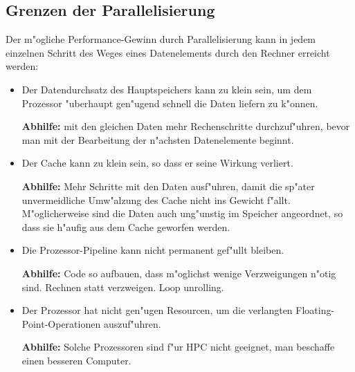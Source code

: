 \subsection{Grenzen der Parallelisierung}
Der m"ogliche Performance-Gewinn durch Parallelisierung kann in jedem einzelnen
Schritt des Weges eines Datenelements durch den Rechner erreicht werden:
\begin{itemize}
\item Der Datendurchsatz des Hauptspeichers kann zu klein sein, um dem 
Prozessor "uberhaupt gen"ugend schnell die Daten liefern zu k"onnen.

{\bf Abhilfe:} mit den gleichen Daten mehr
Rechenschritte durchzuf"uhren, bevor man mit der
Bearbeitung der n"achsten Datenelemente beginnt.
\item Der Cache kann zu klein sein, so dass er seine Wirkung verliert.

{\bf Abhilfe:}
Mehr Schritte mit den Daten ausf"uhren, damit die sp"ater unvermeidliche
Umw"alzung des Cache nicht ins Gewicht f"allt.
M"oglicherweise sind die Daten auch ung"unstig im Speicher angeordnet,
so dass sie h"aufig aus dem Cache geworfen werden.

\item Die Prozessor-Pipeline kann nicht permanent gef"ullt bleiben.

{\bf Abhilfe:} Code so aufbauen, dass m"oglichst wenige Verzweigungen
n"otig sind. Rechnen statt verzweigen. Loop unrolling.

\item Der Prozessor hat nicht gen"ugen Resourcen, um die verlangten
Floating-Point-Operationen auszuf"uhren. 

{\bf Abhilfe:} Solche Prozessoren sind f"ur HPC nicht geeignet, man
beschaffe einen besseren Computer.
\end{itemize}

